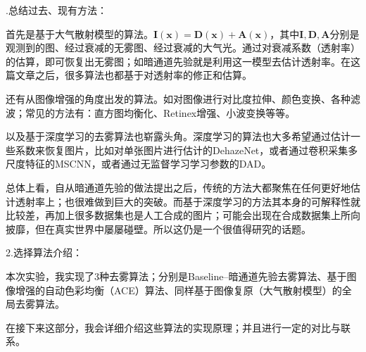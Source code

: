 \documentclass[12pt]{article}
\begin{document}
\begin{large}
    .总结过去、现有方法：\par
\end{large}
首先是基于大气散射模型的算法。$\bm{I}(\bm{x})=\bm{D}(\bm{x})+\bm{A}(\bm{x})$，其中$\bm{I,D,A}$分别是观测到的图、经过衰减的无雾图、经过衰减的大气光。通过对衰减系数（透射率）的估算，即可恢复出无雾图；如暗通道先验\cite{2011Single}就是利用这一模型去估计透射率。在这篇文章之后，很多算法也都基于对透射率的修正和估算。\par
还有从图像增强的角度出发的算法。如对图像进行对比度拉伸、颜色变换、各种滤波；常见的方法有：直方图均衡化、Retinex增强、小波变换等等。\par
以及基于深度学习的去雾算法也崭露头角。深度学习的算法也大多希望通过估计一些系数来恢复图片，比如对单张图片进行估计的DehazeNet\cite{7539399}，或者通过卷积采集多尺度特征的MSCNN\cite{2020Single}，或者通过无监督学习学习参数的DAD\cite{Shao_2020_CVPR}。\par
总体上看，自从暗通道先验的做法提出之后，传统的方法大都聚焦在任何更好地估计透射率上；也很难做到巨大的突破。而基于深度学习的方法其本身的可解释性就比较差，再加上很多数据集也是人工合成的图片；可能会出现在合成数据集上所向披靡，但在真实世界中屡屡碰壁。所以这仍是一个很值得研究的话题。\\
\newpage
\begin{Large}
\noindent 2.选择算法介绍：\par
\end{Large}
本次实验，我实现了3种去雾算法；分别是Baseline--暗通道先验去雾算法\cite{2011Single}、基于图像增强的自动色彩均衡（ACE）算法\cite{ipol.2012.g-ace}、同样基于图像复原（大气散射模型）的全局去雾算\cite{Berman_2016_CVPR}法。\par
在接下来这部分，我会详细介绍这些算法的实现原理；并且进行一定的对比与联系。\\
\end{document}
